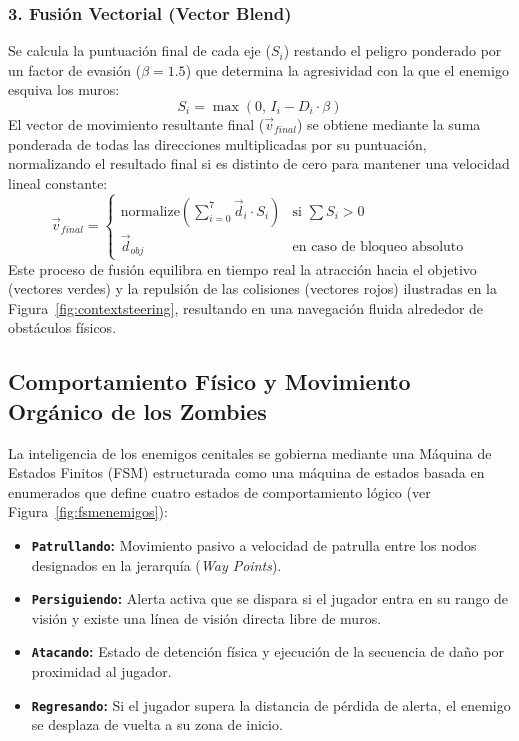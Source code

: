 \subsubsection{3. Fusión Vectorial (Vector Blend)}
Se calcula la puntuación final de cada eje ($S_i$) restando el peligro ponderado por un factor de evasión ($\beta = 1.5$) que determina la agresividad con la que el enemigo esquiva los muros:
\begin{equation}
S_i = \max(0, \, I_i - D_i \cdot \beta)
\end{equation}
El vector de movimiento resultante final ($\vec{v}_{final}$) se obtiene mediante la suma ponderada de todas las direcciones multiplicadas por su puntuación, normalizando el resultado final si es distinto de cero para mantener una velocidad lineal constante:
\begin{equation}
\vec{v}_{final} = \begin{cases}
\mbox{normalize}\left(\sum_{i=0}^{7} \vec{d}_i \cdot S_i\right) & \mbox{si } \sum S_i > 0 \\
\vec{d}_{obj} & \mbox{en caso de bloqueo absoluto}
\end{cases}
\end{equation}
Este proceso de fusión equilibra en tiempo real la atracción hacia el objetivo (vectores verdes) y la repulsión de las colisiones (vectores rojos) ilustradas en la Figura~\ref{fig:contextsteering}, resultando en una navegación fluida alrededor de obstáculos físicos.

\subsection{Comportamiento Físico y Movimiento Orgánico de los Zombies}
La inteligencia de los enemigos cenitales se gobierna mediante una Máquina de Estados Finitos (FSM) estructurada como una máquina de estados basada en enumerados que define cuatro estados de comportamiento lógico (ver Figura~\ref{fig:fsmenemigos}):
\begin{itemize}
    \item \textbf{\texttt{Patrullando}:} Movimiento pasivo a velocidad de patrulla entre los nodos designados en la jerarquía (\textit{Way Points}).
    \item \textbf{\texttt{Persiguiendo}:} Alerta activa que se dispara si el jugador entra en su rango de visión y existe una línea de visión directa libre de muros.
    \item \textbf{\texttt{Atacando}:} Estado de detención física y ejecución de la secuencia de daño por proximidad al jugador.
    \item \textbf{\texttt{Regresando}:} Si el jugador supera la distancia de pérdida de alerta, el enemigo se desplaza de vuelta a su zona de inicio.
\end{itemize}

